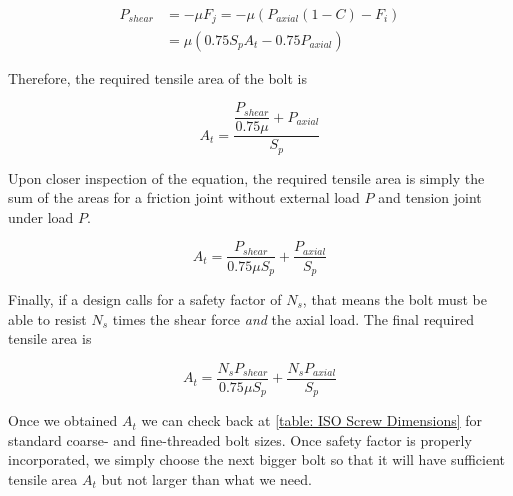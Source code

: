 \documentclass[
10pt,
a4paper,
openany,
svgnames,
]{book}
\begin{document}
\begin{align*}
  P_{shear} &= -\mu F_j = -\mu \left( P_{axial}(1 - C) - F_i \right) \\
            &= \mu (0.75S_pA_t - 0.75P_{axial})
\end{align*}

Therefore, the required tensile area of the bolt is

\begin{equation}
  A_t = \frac{\dfrac{P_{shear}}{0.75\mu } + P_{axial}}{S_p}
\end{equation}

Upon closer inspection of the equation, the required tensile area is simply the sum of the areas for a friction joint without external load $P$ and tension joint under load $P$.

\begin{equation}
  A_t = \frac{P_{shear}}{0.75\mu S_p } + \frac{P_{axial}}{S_p}
\end{equation} 

Finally, if a design calls for a safety factor of $N_s$, that means the bolt must be able to resist $N_s$ times the shear force \emph{and} the axial load. The final required tensile area is

\begin{equation}
  A_t = \frac{N_sP_{shear}}{0.75\mu S_p } + \frac{N_sP_{axial}}{S_p}
  \end{equation} 

  Once we obtained $A_t$ we can check back at \cref{table: ISO Screw Dimensions} for standard coarse- and fine-threaded bolt sizes. Once safety factor is properly incorporated, we simply choose the next bigger bolt so that it will have sufficient tensile area $A_t$ but not larger than what we need.
\end{document}
